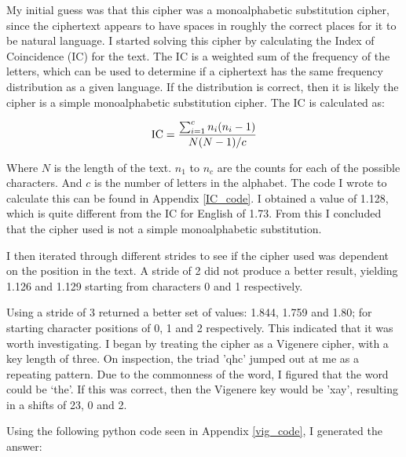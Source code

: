 \documentclass[11pt,a4paper,twoside]{article}
\begin{document}
My initial guess was that this cipher was a monoalphabetic substitution cipher,
since the ciphertext appears to have spaces in roughly the correct places for
it to be natural language. I started solving this cipher by calculating the
Index of Coincidence (IC) for the text. The IC is a weighted sum of the
frequency of the letters, which can be used to determine if a ciphertext has
the same frequency distribution as a given language. If the distribution is
correct, then it is likely the cipher is a simple monoalphabetic substitution
cipher. The IC is calculated as:

$$
\textup{IC} =  \frac{\sum_{i=1}^{c} n_i(n_i -1)}{N(N - 1)/c}
$$

Where $N$ is the length of the text. $n_1$ to $n_c$ are the counts for each of
the possible characters. And $c$ is the number of letters in the alphabet. The
code I wrote to calculate this can be found in Appendix \ref{IC_code}. I
obtained a value of 1.128, which is quite different from the IC for English of
1.73. From this I concluded that the cipher used is not a simple monoalphabetic
substitution. 

I then iterated through different strides to see if the cipher used was
dependent on the position in the text. A stride of 2 did not produce a better
result, yielding 1.126 and 1.129 starting from characters 0 and 1 respectively.  

Using a stride of 3 returned a better set of values: 1.844, 1.759 and 1.80; for
starting character positions of 0, 1 and 2 respectively. This indicated that it
was worth investigating. I began by treating the cipher as a Vigenere cipher,
with a key length of three. On inspection, the triad 'qhc' jumped out at me as
a repeating pattern. Due to the commonness of the word, I figured that the
word could be `the'. If this was correct, then the Vigenere key would be 'xay',
resulting in a shifts of 23, 0 and 2.

Using the following python code seen in Appendix \ref{vig_code}, I generated
the answer: 
\end{document}
